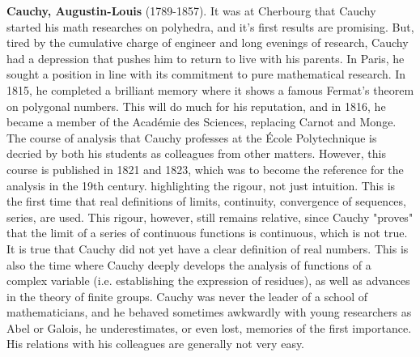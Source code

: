 \textbf{Cauchy, Augustin-Louis} (1789-1857). It was at Cherbourg that Cauchy started his math researches on polyhedra, and it's first results are promising. But, tired by the cumulative charge of engineer and long evenings of research, Cauchy had a depression that pushes him to return to live with his parents. In Paris, he sought a position in line with its commitment to pure mathematical research. In 1815, he completed a brilliant memory where it shows a famous Fermat's theorem on polygonal numbers. This will do much for his reputation, and in 1816, he became a member of the Académie des Sciences, replacing Carnot and Monge. The course of analysis that Cauchy professes at the École Polytechnique is decried by both his students as colleagues from other matters. However, this course is published in 1821 and 1823, which was to become the reference for the analysis in the 19th century. highlighting the rigour, not just intuition. This is the first time that real definitions of limits, continuity, convergence of sequences, series, are used. This rigour, however, still remains relative, since Cauchy "proves" that the limit of a series of continuous functions is continuous, which is not true. It is true that Cauchy did not yet have a clear definition of real numbers. This is also the time where Cauchy deeply develops the analysis of functions of a complex variable (i.e. establishing the expression of residues), as well as advances in the theory of finite groups. Cauchy was never the leader of a school of mathematicians, and he behaved sometimes awkwardly with young researchers as Abel or Galois, he underestimates, or even lost, memories of the first importance. His relations with his colleagues are generally not very easy.

